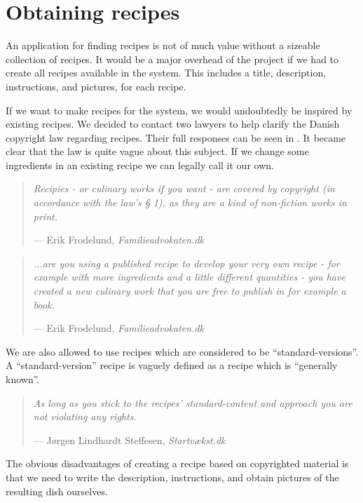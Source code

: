 \section{Obtaining recipes}
An application for finding recipes is not of much value without a sizeable collection of recipes. It would be a major overhead of the project if we had to create all recipes available in the system. This includes a title, description, instructions, and pictures, for each recipe.

If we want to make recipes for the system, we would undoubtedly be inspired by existing recipes. We decided to contact two lawyers to help clarify the Danish copyright law regarding recipes. Their full responses can be seen in . It became clear that the law is quite vague about this subject. If we change some ingredients in an existing recipe we can legally call it our own.
\begin{quote}
\textit{Recipies - or culinary works if you want - are covered by copyright (in accordance with the law's § 1), as they are a kind of non-fiction works in print.}\par\raggedleft--- \textup{Erik Frodelund}, \textit{Familieadvokaten.dk}
\end{quote}
\begin{quote}

\textit{...are you using a published recipe to develop your very own recipe - for example with more ingredients and a little different quantities - you have created a new culinary work that you are free to publish in for example a book.}\par\raggedleft--- \textup{Erik Frodelund}, \textit{Familieadvokaten.dk}
\end{quote}
We are also allowed to use recipes which are considered to be ``standard-versions''. A ``standard-version'' recipe is vaguely defined as a recipe which is ``generally known''.
\begin{quote}
\textit{As long as you stick to the recipes' standard-content and approach you are not violating any rights.}\par\raggedleft--- \textup{Jørgen Lindhardt Steffesen}, \textit{Startvækst.dk}
\end{quote}
The obvious disadvantages of creating a recipe based on copyrighted material is that we need to write the description, instructions, and obtain pictures of the resulting dish ourselves.

